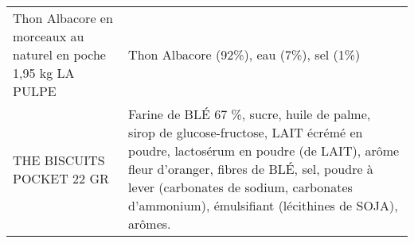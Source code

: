 \begin{longtable}{p{5cm}p{10cm}}
                                           Thon Albacore en morceaux au naturel en poche 1,95 kg LA PULPE &                                                                                                                                                                                                                                                                                                                                                                                                                                                                                                                                                                                                                                                                                                                                                                                                                                                                                                                                                                                                  Thon Albacore (92\%), eau (7\%), sel (1\%) \\
                                                                                THE BISCUITS POCKET 22 GR &                                                                                                                                                                                                                                                                                                                                                                                                                                                                                                                                                                                                                                                                                                                                                          Farine de BLÉ 67 \%, sucre, huile de palme, sirop de glucose-fructose, LAIT écrémé en poudre, lactosérum en poudre (de LAIT), arôme fleur d'oranger, fibres de BLÉ, sel, poudre à lever (carbonates de sodium, carbonates d'ammonium), émulsifiant (lécithines de SOJA), arômes. \\

\end{longtable}
